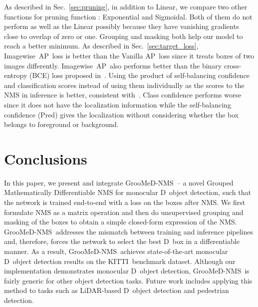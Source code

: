 \documentclass[final]{cvpr}
\newcommand{\myReferSection}[1]{Sec.~\ref{#1}}
\newcommand{\methodName}{GrooMeD-NMS}
\newcommand{\threeD}{D}
\newcommand{\lidar}{LiDAR}
\newcommand{\ap}{AP}
\newcommand{\imageWise}{Imagewise}
\newcommand{\kitti}{KITTI}
\begin{document}
        As described in \myReferSection{sec:pruning}, in addition to Linear, we compare two other functions for pruning function : Exponential and Sigmoidal. 
        Both of them do not perform as well as the Linear  possibly because they have vanishing gradients close to overlap of zero or one. Grouping and masking both help our model to reach a better minimum. 
        As described in \myReferSection{sec:target_loss}, \imageWise~\ap~loss is better than the Vanilla \ap~loss since it treats boxes of two images differently. 
        \imageWise~\ap~also performs better than the binary cross-entropy (BCE) loss proposed in~\cite{hosang2016convnet, henderson2016end, prokudin2017learning, hosang2017learning}. 
        Using the product of self-balancing confidence and classification scores instead of using them individually as the scores to the NMS in inference is better, consistent with~\cite{tychsen2018improving, shi2020distance, kim2020probabilistic}. 
        Class confidence performs worse since it does not have the localization information while the self-balancing confidence (Pred) gives the localization without considering whether the box belongs to foreground or background.

    

\section{Conclusions}
    In this paper, we present and integrate \methodName~-- a novel Grouped Mathematically Differentiable NMS for monocular \threeD~object detection, such that the network is trained end-to-end with a loss on the boxes after NMS. 
    We first formulate NMS as a matrix operation and then do unsupervised grouping and masking of the boxes to obtain a simple closed-form expression of the NMS. 
    \methodName~addresses the mismatch between training and inference pipelines and, therefore, forces the network to  select the best \threeD~box in a differentiable manner. 
    As a result, \methodName~achieves state-of-the-art monocular \threeD~object detection results on the \kitti~benchmark dataset. 
    Although our implementation demonstrates monocular \threeD~object detection, \methodName~is fairly generic for other object detection tasks. 
    Future work includes applying this method to tasks such as \lidar-based \threeD~object detection and pedestrian detection.


\clearpage
{\small


}
\end{document}
